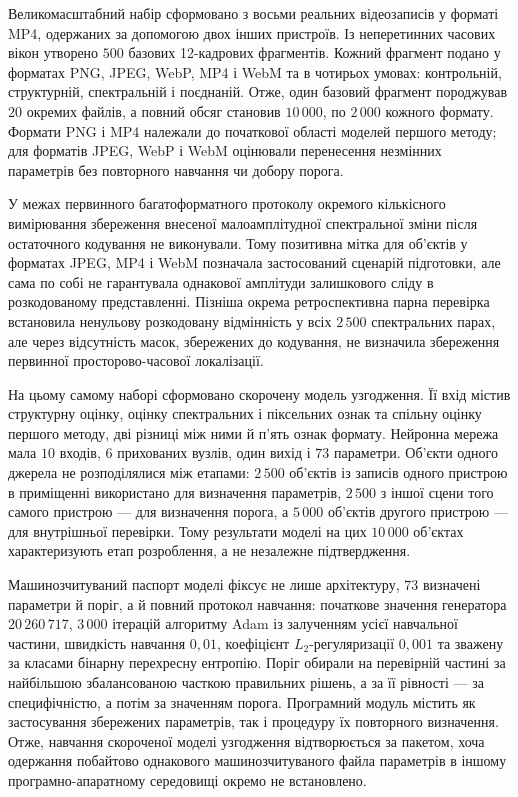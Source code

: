 Великомасштабний набір сформовано з восьми реальних відеозаписів у форматі MP4, одержаних за допомогою двох інших пристроїв. Із неперетинних часових вікон утворено $500$ базових 12-кадрових фрагментів. Кожний фрагмент подано у форматах PNG, JPEG, WebP, MP4 і WebM та в чотирьох умовах: контрольній, структурній, спектральній і поєднаній. Отже, один базовий фрагмент породжував $20$ окремих файлів, а повний обсяг становив $10\,000$, по $2\,000$ кожного формату. Формати PNG і MP4 належали до початкової області моделей першого методу; для форматів JPEG, WebP і WebM оцінювали перенесення незмінних параметрів без повторного навчання чи добору порога.

У межах первинного багатоформатного протоколу окремого кількісного вимірювання збереження внесеної малоамплітудної спектральної зміни після остаточного кодування не виконували. Тому позитивна мітка для об’єктів у форматах JPEG, MP4 і WebM позначала застосований сценарій підготовки, але сама по собі не гарантувала однакової амплітуди залишкового сліду в розкодованому представленні. Пізніша окрема ретроспективна парна перевірка встановила ненульову розкодовану відмінність у всіх $2\,500$ спектральних парах, але через відсутність масок, збережених до кодування, не визначила збереження первинної просторово-часової локалізації.

На цьому самому наборі сформовано скорочену модель узгодження. Її вхід містив структурну оцінку, оцінку спектральних і піксельних ознак та спільну оцінку першого методу, дві різниці між ними й п’ять ознак формату. Нейронна мережа мала $10$ входів, $6$ прихованих вузлів, один вихід і $73$ параметри. Об’єкти одного джерела не розподілялися між етапами: $2\,500$ об’єктів із записів одного пристрою в приміщенні використано для визначення параметрів, $2\,500$ з іншої сцени того самого пристрою --- для визначення порога, а $5\,000$ об’єктів другого пристрою --- для внутрішньої перевірки. Тому результати моделі на цих $10\,000$ об’єктах характеризують етап розроблення, а не незалежне підтвердження.

Машинозчитуваний паспорт моделі фіксує не лише архітектуру, $73$ визначені параметри й поріг, а й повний протокол навчання: початкове значення генератора $20\,260\,717$, $3\,000$ ітерацій алгоритму Adam із залученням усієї навчальної частини, швидкість навчання $0{,}01$, коефіцієнт $L_2$-регуляризації $0{,}001$ та зважену за класами бінарну перехресну ентропію. Поріг обирали на перевірній частині за найбільшою збалансованою часткою правильних рішень, а за її рівності --- за специфічністю, а потім за значенням порога. Програмний модуль містить як застосування збережених параметрів, так і процедуру їх повторного визначення. Отже, навчання скороченої моделі узгодження відтворюється за пакетом, хоча одержання побайтово однакового машинозчитуваного файла параметрів в іншому програмно-апаратному середовищі окремо не встановлено.

